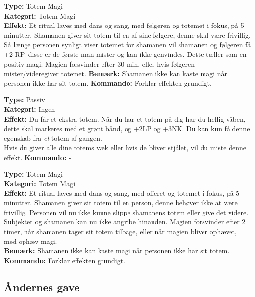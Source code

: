 \begin{orleks arv*}
\textbf{Type:} Totem Magi\\
\textbf{Kategori:} Totem Magi\\
\textbf{Effekt:} Et ritual laves med dans og sang, med følgeren og totemet i fokus, på 5 minutter.
Shamanen giver sit totem til en af sine følgere, denne skal være frivillig. Så længe personen synligt viser totemet for shamanen vil shamanen og følgeren få +2 RP, disse er de første man mister og kan ikke genvindes. Dette tæller som en positiv magi. Magien forsvinder efter 30 min, eller hvis følgeren mister/videregiver totemet.
\textbf{Bemærk:} Shamanen ikke kan kaste magi når personen ikke har sit totem.
\textbf{Kommando:} Forklar effekten grundigt.
\end{orleks arv*}

\begin{orleks arv*}
\textbf{Type:} Passiv\\
\textbf{Kategori:} Ingen\\
\textbf{Effekt:} Du får et ekstra totem. Når du har et totem på dig har du hellig våben, dette skal markeres med et grønt bånd, og +2LP og +3NK. Du kan kun få denne egenskab fra \emph{et} totem af gangen.\\
Hvis du giver alle dine totems væk eller hvis de bliver stjålet, vil du miste denne effekt.
\textbf{Kommando:} -
\end{orleks arv*}

\begin{orleks arv*}
\textbf{Type:} Totem Magi\\
\textbf{Kategori:} Totem Magi\\
\textbf{Effekt:} Et ritual laves med dans og sang, med offeret og totemet i fokus, på 5 minutter.
Shamanen giver sit totem til en person, denne behøver ikke at være frivillig.
Personen vil nu ikke kunne slippe shamanens totem eller give det videre. Subjektet og shamanen kan nu ikke angribe hinanden. 
Magien forsvinder efter 2 timer, når shamanen tager sit totem tilbage, eller når magien bliver ophævet, med ophæv magi.\\
\textbf{Bemærk:} Shamanen ikke kan kaste magi når personen ikke har sit totem.\\
\textbf{Kommando:} Forklar effekten grundigt.
\end{orleks arv*}

\subsection{Åndernes gave}

